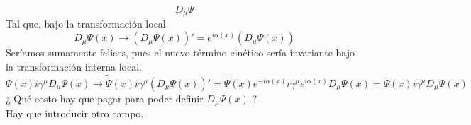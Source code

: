\documentclass[../main.tex]{subfiles}
\begin{document}
 \begin{equation}
   D_\mu \Psi
  \end{equation}
  Tal que, bajo la transformación local
  \begin{equation}
    D_\mu \Psi(x) \rightarrow \left( D_\mu \Psi(x) \right) ' = e^{i\alpha(x)} (  D_\mu\Psi(x) )
   \end{equation}
  Seríamos sumamente felices, pues el nuevo término cinético sería invariante bajo la transformación interna local.
  \begin{equation}
    \bar{\Psi}(x) i\gamma^\mu D_\mu \Psi(x) \rightarrow \tilde{\bar{\Psi}} (x) i \gamma^\mu \left( D_\mu \Psi(x) \right)' = \bar{\Psi}(x) e^{-i\alpha(x)} i\gamma^\mu e^{i\alpha(x)}D_\mu \Psi(x) = \bar{\Psi}(x) i \gamma^\mu D_\mu \Psi(x)
   \end{equation}
   ¿ Qué costo hay que pagar para poder definir $D_\mu \Psi(x)$ ? \\
   Hay que introducir otro campo. \\
\end{document}
